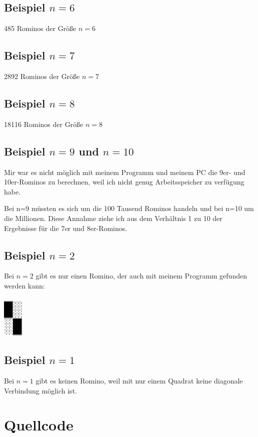 \documentclass[a4paper,10pt]{scrartcl}
\begin{document}
\subsection{Beispiel \(n=6\)}
485 Rominos der Größe \(n=6\)

\subsection{Beispiel \(n=7\)}
2892 Rominos der Größe \(n=7\)

\subsection{Beispiel \(n=8\)}
18116 Rominos der Größe \(n=8\)

\subsection{Beispiel \(n=9\) und \(n=10\)}
Mir war es nicht möglich mit meinem Programm und meinem PC die 9er- und 10er-Rominos zu berechnen, weil ich nicht genug Arbeitsspeicher zu verfügung habe.

Bei n=9 müssten es sich um die 100 Tausend Rominos handeln und bei n=10 um die Millionen. Diese Annahme ziehe ich aus dem Verhältnis 1 zu 10 der Ergebnisse für die 7er und 8er-Rominos.

\subsection{Beispiel \(n=2\)}
Bei \(n=2\) gibt es nur einen Romino, der auch mit meinem Programm gefunden werden kann: \\\\
\includegraphics{2.jpg}

\subsection{Beispiel \(n=1\)}
Bei \(n=1\) gibt es keinen Romino, weil mit nur einem Quadrat keine diagonale Verbindung möglich ist.

\section{Quellcode}
\lstset{numbers=left}

\end{document}
